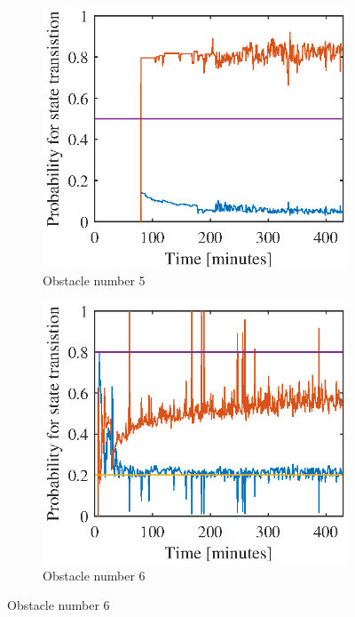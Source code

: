\begin{figure}[htbp]
	\begin{subfigure}[t]{0.5\linewidth}
		\centering
		\includegraphics[width=1\linewidth]{chapters/appendix/figures/learning_curves/obs5}
		\caption{Obstacle number 5}
	\end{subfigure}
	\hspace*{\fill}
	\begin{subfigure}[t]{0.5\linewidth}
		\centering
		\includegraphics[width=1\linewidth]{chapters/appendix/figures/learning_curves/obs6}
		\caption{Obstacle number 6}
	\end{subfigure}
	

\end{figure}
